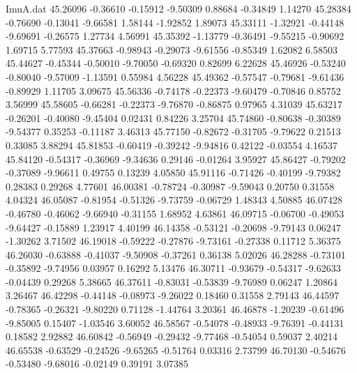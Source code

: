 \begin{filecontents}{ImuA.dat}
  45.26096   -0.36610   -0.15912   -9.50309    0.88684   -0.34849    1.14270
  45.28384   -0.76690   -0.13041   -9.66581    1.58144   -1.92852    1.89073
  45.33111   -1.32921   -0.44148   -9.69691   -0.26575    1.27734    4.56991
  45.35392   -1.13779   -0.36491   -9.55215   -0.90692    1.69715    5.77593
  45.37663   -0.98943   -0.29073   -9.61556   -0.85349    1.62082    6.58503
  45.44627   -0.45344   -0.50010   -9.70050   -0.69320    0.82699    6.22628
  45.46926   -0.53240   -0.80040   -9.57009   -1.13591    0.55984    4.56228
  45.49362   -0.57547   -0.79681   -9.61436   -0.89929    1.11705    3.09675
  45.56336   -0.74178   -0.22373   -9.60479   -0.70846    0.85752    3.56999
  45.58605   -0.66281   -0.22373   -9.76870   -0.86875    0.97965    4.31039
  45.63217   -0.26201   -0.40080   -9.45404    0.02431    0.84226    3.25704
  45.74860   -0.80638   -0.30389   -9.54377    0.35253   -0.11187    3.46313
  45.77150   -0.82672   -0.31705   -9.79622    0.21513    0.33085    3.88294
  45.81853   -0.60419   -0.39242   -9.94816    0.42122   -0.03554    4.16537
  45.84120   -0.54317   -0.36969   -9.34636    0.29146   -0.01264    3.95927
  45.86427   -0.79202   -0.37089   -9.96611    0.49755    0.13239    4.05850
  45.91116   -0.71426   -0.40199   -9.79382    0.28383    0.29268    4.77601
  46.00381   -0.78724   -0.30987   -9.59043    0.20750    0.31558    4.04324
  46.05087   -0.81954   -0.51326   -9.73759   -0.06729    1.48343    4.50885
  46.07428   -0.46780   -0.46062   -9.66940   -0.31155    1.68952    4.63861
  46.09715   -0.06700   -0.49053   -9.64427   -0.15889    1.23917    4.40199
  46.14358   -0.53121   -0.20698   -9.79143    0.06247   -1.30262    3.71502
  46.19018   -0.59222   -0.27876   -9.73161   -0.27338    0.11712    5.36375
  46.26030   -0.63888   -0.41037   -9.50908   -0.37261    0.36138    5.02026
  46.28288   -0.73101   -0.35892   -9.74956    0.03957    0.16292    5.13476
  46.30711   -0.93679   -0.54317   -9.62633   -0.04439    0.29268    5.38665
  46.37611   -0.83031   -0.53839   -9.76989    0.06247    1.20864    3.26467
  46.42298   -0.44148   -0.08973   -9.26022    0.18460    0.31558    2.79143
  46.44597   -0.78365   -0.26321   -9.80220    0.71128   -1.44764    3.20361
  46.46878   -1.20239   -0.61496   -9.85005    0.15407   -1.03546    3.60052
  46.58567   -0.54078   -0.48933   -9.76391   -0.44131    0.18582    2.92882
  46.60842   -0.56949   -0.29432   -9.77468   -0.54054    0.59037    2.40214
  46.65538   -0.63529   -0.24526   -9.65265   -0.51764    0.03316    2.73799
  46.70130   -0.54676   -0.53480   -9.68016   -0.02149    0.39191    3.07385

\end{filecontents}
